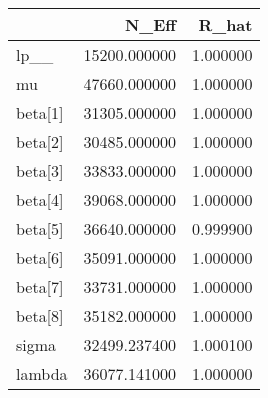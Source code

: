 \begin{tabular}{lrr}
\toprule
 & N_Eff & R_hat \\
\midrule
lp__ & 15200.000000 & 1.000000 \\
mu & 47660.000000 & 1.000000 \\
beta[1] & 31305.000000 & 1.000000 \\
beta[2] & 30485.000000 & 1.000000 \\
beta[3] & 33833.000000 & 1.000000 \\
beta[4] & 39068.000000 & 1.000000 \\
beta[5] & 36640.000000 & 0.999900 \\
beta[6] & 35091.000000 & 1.000000 \\
beta[7] & 33731.000000 & 1.000000 \\
beta[8] & 35182.000000 & 1.000000 \\
sigma & 32499.237400 & 1.000100 \\
lambda & 36077.141000 & 1.000000 \\
\bottomrule
\end{tabular}
